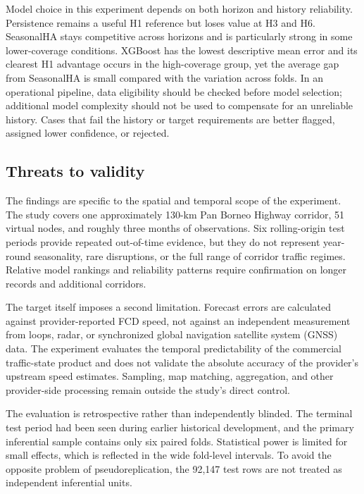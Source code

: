 \documentclass[pdflatex,sn-basic,Numbered]{sn-jnl}
\begin{document}
Model choice in this experiment depends on both horizon and history reliability. Persistence remains a useful H1 reference but loses value at H3 and H6. SeasonalHA stays competitive across horizons and is particularly strong in some lower-coverage conditions. XGBoost has the lowest descriptive mean error and its clearest H1 advantage occurs in the high-coverage group, yet the average gap from SeasonalHA is small compared with the variation across folds. In an operational pipeline, data eligibility should be checked before model selection; additional model complexity should not be used to compensate for an unreliable history. Cases that fail the history or target requirements are better flagged, assigned lower confidence, or rejected.

\subsection{Threats to validity}
\label{subsec:validity}

The findings are specific to the spatial and temporal scope of the experiment. The study covers one approximately 130-km Pan Borneo Highway corridor, 51 virtual nodes, and roughly three months of observations. Six rolling-origin test periods provide repeated out-of-time evidence, but they do not represent year-round seasonality, rare disruptions, or the full range of corridor traffic regimes. Relative model rankings and reliability patterns require confirmation on longer records and additional corridors.

The target itself imposes a second limitation. Forecast errors are calculated against provider-reported FCD speed, not against an independent measurement from loops, radar, or synchronized global navigation satellite system (GNSS) data. The experiment evaluates the temporal predictability of the commercial traffic-state product and does not validate the absolute accuracy of the provider's upstream speed estimates. Sampling, map matching, aggregation, and other provider-side processing remain outside the study's direct control.

The evaluation is retrospective rather than independently blinded. The terminal test period had been seen during earlier historical development, and the primary inferential sample contains only six paired folds. Statistical power is limited for small effects, which is reflected in the wide fold-level intervals. To avoid the opposite problem of pseudoreplication, the 92,147 test rows are not treated as independent inferential units.
\end{document}
